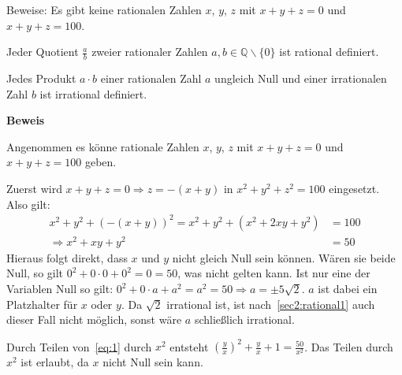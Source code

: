 \documentclass[10pt, a4paper]{amsart}
\makeatletter
\renewcommand\proofname{Beweis}
\renewenvironment{proof}[1][\proofname]{\par
\pushQED{\qed}%
\normalfont \topsep6\p@\@plus6\p@\relax
\trivlist
\item\relax
{\bfseries#1}\hspace\labelsep\ignorespaces
}{%
\popQED\endtrivlist\@endpefalse
}
\makeatother
\begin{document}
\newpage
\begin{aufgabe}
  Beweise: Es gibt keine rationalen Zahlen $x$, $y$, $z$ mit $x + y + z = 0$ und
  $x + y + z = 100$.
\end{aufgabe}
\begin{lemma}\label{sec2:rational1}
  Jeder Quotient $\frac{a}{b}$ zweier rationaler Zahlen $a,b∈ℚ\backslash\{0\}$
  ist rational definiert.
\end{lemma}
\begin{lemma}\label{sec2:rational2}
  Jedes Produkt $ a\cdot b $ einer rationalen Zahl $a$ ungleich Null und einer
  irrationalen Zahl $b$ ist irrational definiert.
\end{lemma}
\begin{proof}
  Angenommen es könne rationale Zahlen $x$, $y$, $z$ mit $x + y + z = 0$ und
  $x + y + z = 100$ geben.
  
  Zuerst wird $x+y+z = 0 \Rightarrow z = -(x+y)$ in $x^2+y^2+z^2 = 100$
  eingesetzt. Also gilt:
  \begin{equation}
    \label{eq:1}
    \begin{split}
      x^2+y^2+(-(x+y))^2 = x^2+y^2+(x^2+2xy+y^2) &= 100\\
      \Rightarrow x^2+xy+y^2&=50
    \end{split}
  \end{equation}
  Hieraus folgt direkt, dass $x$ und $y$ nicht gleich Null sein können. Wären sie
  beide Null, so gilt $0^2+0\cdot0+0^2=0=50$, was nicht gelten kann. Ist nur eine der Variablen
  Null so gilt: $0^2+0\cdot a+a^2=a^2=50\Rightarrow a = \pm5\sqrt{2}$. $a$ ist
  dabei ein Platzhalter für $x$ oder $y$. Da $\sqrt{2}$ irrational ist, ist
  nach~\autoref{sec2:rational1} auch dieser Fall nicht möglich, sonst wäre $a$
  schließlich irrational.

  Durch Teilen von~\eqref{eq:1} durch $x^2$ entsteht
  $(\frac{y}{x})^2+\frac{y}{x}+1=\frac{50}{x^2}$. Das Teilen durch $x^2$ ist
  erlaubt, da $x$ nicht Null sein kann.
  

\end{proof}
\end{document}
